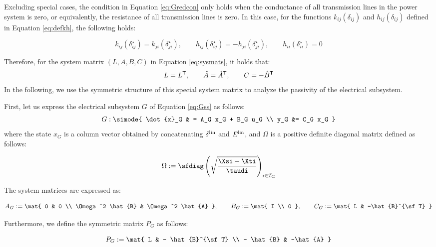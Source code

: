 \documentclass[graybox, envcountchap]{svmult}
\begin{document}
Excluding special cases, the condition in Equation \ref{eq:Gredcon} only holds
when the conductance of all transmission lines in the power system is zero, or
equivalently, the resistance of all transmission lines is zero. In this case,
for the functions $k_{ij}(\delta_{ij})$ and $h_{ij}(\delta_{ij})$ defined in
Equation \ref{eq:defkh}, the following holds: 

\begin{equation*}
  k_{ij}(\delta_{ij}^{\star}) =
  k_{ji}(\delta_{ji}^{\star})
  ,\qquad
  h_{ij}(\delta_{ij}^{\star}) = 
  - h_{ji}(\delta_{ji}^{\star}),\qquad
  h_{ii}(\delta_{ii}^{\star}) = 0
\end{equation*}

Therefore, for the system matrix $(L,A,B,C)$ in Equation \ref{eq:sysmats}, it
holds that:
\begin{equation}\label{eq:sysmatst}
  L=L^{\sf T} ,\qquad
  \hat{A} = \hat{A}^{\sf T},\qquad
  C= -\hat{B}^{\sf T}
\end{equation}
In the following, we use the symmetric structure of this special system matrix
to analyze the passivity of the electrical subsystem.

First, let us express the electrical subsystem $G$ of Equation \ref{eq:Gss} as
follows:
\begin{align}
  G: \simode{
  \dot{x}_G & = A_G x_G + B_G u_G \\
  y_G &= C_G x_G
  }
\end{align}
where the state $x_G$ is a column vector obtained by concatenating
${\delta}^{\rm lin}$ and $ E^{\rm lin} $, and $\Omega$ is a positive definite
diagonal matrix defined as follows:

\[
  \Omega :=
  \sfdiag \left( \sqrt{\frac{ \Xsi - \Xti }{ \taudi } } \right)_{i \in \mathcal{I}_{\rm G} }
\]

The system matrices are expressed as:

\[
  A_G := 
  \mat{
  0 & 0 \\
  \Omega^2 \hat{B}   &  \Omega^2 \hat{A} 
  },\qquad
  B_G := 
  \mat{
  I \\
  0
  },\qquad
  C_G := 
  \mat{
  L & -\hat{B}^{\sf T}
  }
\]

Furthermore, we define the symmetric matrix $P_G$ as follows:

\begin{equation}\label{eq:defPG}
  P_G := 
  \mat{
    L  &  - \hat{B}^{\sf T} \\
    - \hat{B} & -\hat{A}
  }
\end{equation}
\end{document}
